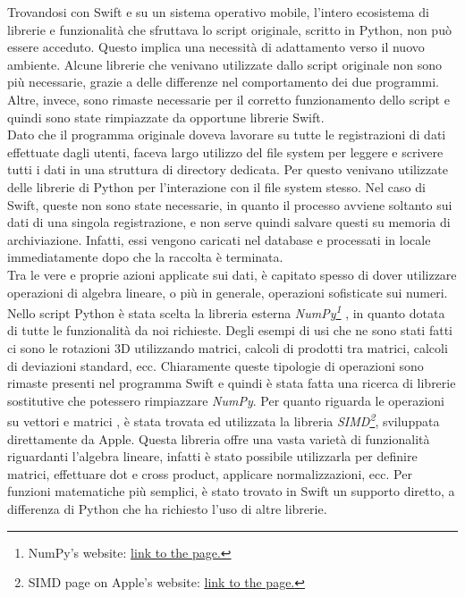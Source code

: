 Trovandosi con Swift e su un sistema operativo mobile, l'intero ecosistema di librerie
e funzionalità che sfruttava lo script originale, scritto in Python, non può essere
acceduto. Questo implica una necessità di adattamento verso il nuovo ambiente. 
Alcune librerie che venivano utilizzate dallo script originale non sono più
necessarie, grazie a delle differenze nel comportamento dei due programmi.
Altre, invece, sono rimaste necessarie per il corretto funzionamento dello script e 
quindi sono state rimpiazzate da opportune librerie Swift.\\
Dato che il programma originale doveva lavorare su tutte le registrazioni di dati 
effettuate dagli utenti, faceva largo utilizzo del file system per leggere e scrivere 
tutti i dati in una struttura di directory dedicata. Per questo venivano utilizzate
delle librerie di Python per l'interazione con il file system stesso. Nel caso di 
Swift, queste non sono state necessarie, in quanto il processo avviene soltanto 
sui dati di una singola registrazione, e non serve quindi salvare questi su memoria
di archiviazione. Infatti, essi vengono caricati nel database e processati in locale
immediatamente dopo che la raccolta è terminata.\\
Tra le vere e proprie azioni applicate sui dati, è capitato spesso di dover utilizzare 
operazioni di algebra lineare, o più in generale, operazioni sofisticate sui numeri.
Nello script Python è stata scelta la libreria esterna \emph{NumPy\footnote{
NumPy's website: 
\href{https://numpy.org}{\underline{link to the page.}}}} \cite{guide_numpy},
in quanto dotata
di tutte le funzionalità da noi richieste. Degli esempi di usi che ne sono stati fatti 
ci sono le rotazioni 3D utilizzando matrici, calcoli di prodotti tra matrici, calcoli 
di deviazioni standard, ecc. Chiaramente queste tipologie di operazioni sono rimaste
presenti nel programma Swift e quindi è stata fatta una ricerca di librerie sostitutive 
che potessero rimpiazzare \emph{NumPy}. Per quanto riguarda le operazioni su vettori 
e matrici \cite{simd_vector_operations}, è stata trovata ed utilizzata la libreria 
\emph{SIMD\footnote{SIMD page on Apple's website: 
\href{https://developer.apple.com/documentation/accelerate/simd}{\underline{link to the page.}}}}, sviluppata 
direttamente da Apple. Questa libreria offre una vasta varietà di funzionalità
riguardanti l'algebra lineare, infatti è stato possibile utilizzarla per definire
matrici, effettuare dot e cross product, applicare normalizzazioni, ecc.
Per funzioni matematiche più semplici, è stato trovato in Swift un supporto 
diretto, a differenza di Python che ha richiesto l'uso di altre librerie.

